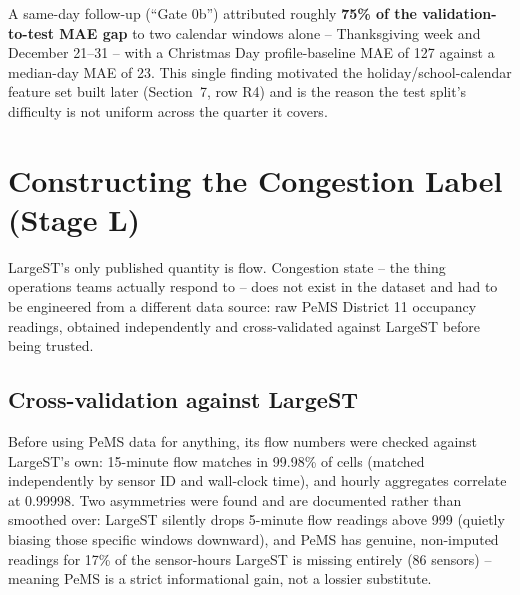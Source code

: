\documentclass[11pt]{article}
\begin{document}
\begin{finding}
A same-day follow-up (``Gate 0b'') attributed roughly \textbf{75\% of the validation-to-test MAE
gap} to two calendar windows alone -- Thanksgiving week and December 21--31 -- with a Christmas
Day profile-baseline MAE of 127 against a median-day MAE of 23. This single finding motivated the
holiday/school-calendar feature set built later (Section~7, row R4) and is the reason the test
split's difficulty is not uniform across the quarter it covers.
\end{finding}

\section{Constructing the Congestion Label (Stage L)}

LargeST's only published quantity is flow. Congestion state -- the thing operations teams
actually respond to -- does not exist in the dataset and had to be engineered from a different
data source: raw PeMS District 11 occupancy readings, obtained independently and cross-validated
against LargeST before being trusted.

\subsection{Cross-validation against LargeST}
Before using PeMS data for anything, its flow numbers were checked against LargeST's own: 15-minute
flow matches in 99.98\% of cells (matched independently by sensor ID and wall-clock time), and
hourly aggregates correlate at 0.99998. Two asymmetries were found and are documented rather than
smoothed over: LargeST silently drops 5-minute flow readings above 999 (quietly biasing those
specific windows downward), and PeMS has genuine, non-imputed readings for 17\% of the sensor-hours
LargeST is missing entirely (86 sensors) -- meaning PeMS is a strict informational gain, not a
lossier substitute.
\end{document}
